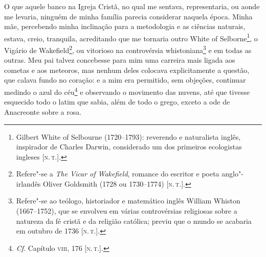 O que aquele banco na Igreja Cristã, no qual me sentava, representaria,
ou aonde me levaria, ninguém de minha família parecia considerar naquela
época. Minha mãe, percebendo minha inclinação para a metodologia e as
ciências naturais, estava, creio, tranquila, acreditando que me tornaria
outro White of Selborne\footnote{Gilbert White of Selbourne (1720--1793):
  reverendo e naturalista inglês, inspirador de Charles Darwin,
  considerado um dos primeiros ecologistas ingleses {[}\textsc{n.\,t.}{]}.}, o
Vigário de Wakefield\footnote{Refere"-se a \emph{The Vicar of Wakefield},
  romance do escritor e poeta anglo"-irlandês Oliver Goldsmith (1728 ou
  1730--1774) {[}\textsc{n.\,t.}{]}.}, ou vitorioso na controvérsia
whistoniana\footnote{Refere"-se ao teólogo, historiador e matemático
  inglês William Whiston (1667--1752), que se envolveu em várias
  controvérsias religiosas sobre a natureza da fé cristã e da religião
  católica; previu que o mundo se acabaria em outubro de 1736 {[}\textsc{n.\,t.}{]}.} e em todas as outras. Meu pai talvez concebesse para mim uma
carreira mais ligada aos cometas e aos meteoros, mas nenhum deles
colocava explicitamente a questão, que calava fundo no coração: e a mim
era permitido, sem objeções, continuar medindo o azul do céu\footnote{\emph{Cf}.
  Capítulo \textsc{viii}, 176 {[}\textsc{n.\,t.}{]}.} e observando o movimento das
nuvens, até que tivesse esquecido todo o latim que sabia, além de todo o
grego, exceto a ode de Anacreonte sobre a rosa.

